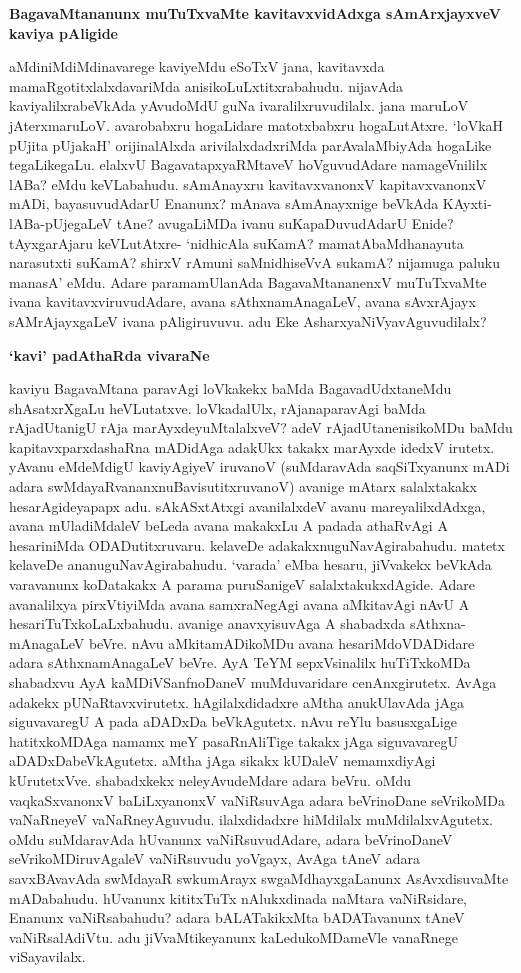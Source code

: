 {\bf BagavaMtananunx muTuTxvaMte kavitavxvidAdxga sAmArxjayxveV kaviya pAligide}

aMdiniMdiMdinavarege kaviyeMdu eSoTxV jana, kavitavxda mamaRgotitxlalxdavariMda anisikoLuLxtitxrabahudu. nijavAda kaviyalilxrabeVkAda yAvudoMdU guNa ivaralilxruvudilalx. jana maruLoV jAterxmaruLoV. avarobabxru hogaLidare matotxbabxru hogaLutAtxre. `loVkaH pUjita pUjakaH' orijinalAlxda arivilalxdadxriMda parAvalaMbiyAda hogaLike tegaLikegaLu. elalxvU BagavatapxyaRMtaveV hoVguvudAdare namageVnililx lABa? eMdu keVLabahudu. sAmAnayxru kavitavxvanonxV kapitavxvanonxV mADi, bayasuvudAdarU Enanunx? mAnava sAmAnayxnige beVkAda KAyxti-lABa-pUjegaLeV tAne? avugaLiMDa ivanu suKapaDuvudAdarU Enide? tAyxgarAjaru keVLutAtxre- `nidhicAla suKamA? mamatAbaMdhanayuta narasutxti suKamA? shirxV rAmuni saMnidhiseVvA sukamA? nijamuga paluku manasA' eMdu. Adare paramamUlanAda BagavaMtananenxV muTuTxvaMte ivana kavitavxviruvudAdare, avana sAthxnamAnagaLeV, avana sAvxrAjayx sAMrAjayxgaLeV ivana pAligiruvuvu. adu Eke AsharxyaNiVyavAguvudilalx?

{\bf `kavi' padAthaRda vivaraNe}

kaviyu BagavaMtana paravAgi loVkakekx baMda BagavadUdxtaneMdu shAsatxrXgaLu heVLutatxve. loVkadalUlx, rAjanaparavAgi baMda rAjadUtanigU rAja marAyxdeyuMtalalxveV? adeV rAjadUtanenisikoMDu baMdu kapitavxparxdashaRna mADidAga adakUkx takakx marAyxde idedxV irutetx. yAvanu eMdeMdigU kaviyAgiyeV iruvanoV (suMdaravAda saqSiTxyanunx mADi adara swMdayaRvananxnuBavisutitxruvanoV) avanige mAtarx salalxtakakx hesarAgideyapapx adu. sAkASxtAtxgi avanilalxdeV avanu mareyalilxdAdxga, avana mUladiMdaleV beLeda avana makakxLu A padada athaRvAgi A hesariniMda ODADutitxruvaru. kelaveDe adakakxnuguNavAgirabahudu. matetx kelaveDe ananuguNavAgirabahudu. `varada' eMba hesaru, jiVvakekx beVkAda varavanunx koDatakakx A parama puruSanigeV salalxtakukxdAgide. Adare avanalilxya pirxVtiyiMda avana samxraNegAgi avana aMkitavAgi nAvU A hesariTuTxkoLaLxbahudu. avanige anavxyisuvAga A shabadxda sAthxna-mAnagaLeV beVre. nAvu aMkitamADikoMDu avana hesariMdoVDADidare adara sAthxnamAnagaLeV beVre. AyA TeYM sepxVsinalilx huTiTxkoMDa shabadxvu AyA kaMDiVSanfnoDaneV muMduvaridare cenAnxgirutetx. AvAga adakekx pUNaRtavxvirutetx. hAgilalxdidadxre aMtha anukUlavAda jAga siguvavaregU A pada aDADxDa beVkAgutetx. nAvu reYlu basusxgaLige hatitxkoMDAga namamx meY pasaRnAliTige takakx jAga siguvavaregU aDADxDabeVkAgutetx. aMtha jAga sikakx kUDaleV nemamxdiyAgi kUrutetxVve. shabadxkekx neleyAvudeMdare adara beVru. oMdu vaqkaSxvanonxV baLiLxyanonxV vaNiRsuvAga adara beVrinoDane seVrikoMDa vaNaRneyeV vaNaRneyAguvudu. ilalxdidadxre hiMdilalx muMdilalxvAgutetx. oMdu suMdaravAda hUvanunx vaNiRsuvudAdare, adara beVrinoDaneV seVrikoMDiruvAgaleV vaNiRsuvudu yoVgayx, AvAga tAneV adara savxBAvavAda swMdayaR swkumArayx swgaMdhayxgaLanunx AsAvxdisuvaMte mADabahudu. hUvanunx kititxTuTx nAlukxdinada naMtara vaNiRsidare, Enanunx vaNiRsabahudu? adara bALATakikxMta bADATavanunx tAneV vaNiRsalAdiVtu. adu jiVvaMtikeyanunx kaLedukoMDameVle vanaRnege viSayavilalx.

